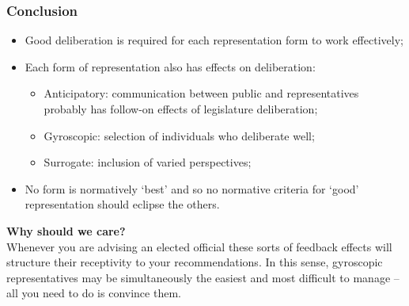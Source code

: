 \documentclass[aspectratio=169]{beamer}
\theoremstyle{principle}
\begin{document}
\begin{frame}
\frametitle{Conclusion}
\begin{itemize}
\item Good deliberation is required for each representation form to work effectively;
\bigskip
\bigskip
\item Each form of representation also has effects on deliberation:
\begin{itemize}
\item Anticipatory: communication between public and representatives probably has follow-on effects of legislature deliberation;
\item Gyroscopic: selection of individuals who deliberate well;
\item Surrogate: inclusion of varied perspectives;
\end{itemize}
\bigskip
\bigskip
\item No form is normatively `best' and so no normative criteria for `good' representation should eclipse the others.
\end{itemize}

\end{frame}

\begin{frame}

\begin{center}
\Huge\textbf{Why should we care?}\\
\bigskip
\bigskip
\large Whenever you are advising an elected official these sorts of feedback effects will structure their receptivity to your recommendations.  In this sense, gyroscopic representatives may be simultaneously the easiest and most difficult to manage -- all you need to do is convince them.\\
\end{center}

\end{frame}
\end{document}
